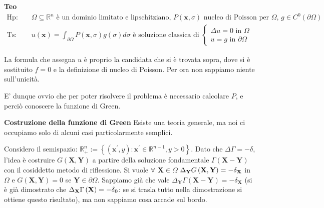 \documentclass{article}
\begin{document}
\textbf{Teo}%
\begin{eqnarray*}
\text{Hp}\text{: } &&\Omega \subseteq 
\mathbb{R}
^{n}\text{ \`{e} un dominio limitato e lipschitziano, }P\left( \mathbf{x}%
,\sigma \right) \text{ nucleo di Poisson per }\Omega \text{, }g\in
C^{0}\left( \partial \Omega \right) \\
\text{Ts}\text{: } &&u\left( \mathbf{x}\right) =\int_{\partial \Omega
}P\left( \mathbf{x},\sigma \right) g\left( \sigma \right) d\sigma \text{ 
\`{e} soluzione classica di }\left\{ 
\begin{array}{c}
\Delta u=0\text{ in }\Omega \\ 
u=g\text{ in }\partial \Omega%
\end{array}%
\right.
\end{eqnarray*}

La formula che assegna $u$ \`{e} proprio la candidata che si \`{e} trovata
sopra, dove si \`{e} sostituito $f=0$ e la definizione di nucleo di Poisson.
Per ora non sappiamo niente sull'unicit\`{a}.

E' dunque ovvio che per poter risolvere il problema \`{e} necessario
calcolare $P$, e perci\`{o} conoscere la funzione di Green.

\textbf{Costruzione della funzione di Green} Esiste una teoria generale, ma
noi ci occupiamo solo di alcuni casi particolarmente semplici.

Considero il semispazio: $%
\mathbb{R}
_{+}^{n}:=\left\{ \left( \mathbf{x}^{\prime },y\right) :\mathbf{x}^{\prime
}\in 
\mathbb{R}
^{n-1},y>0\right\} $. Dato che $\Delta \Gamma =-\delta $, l'idea \`{e}
costruire $G\left( \mathbf{X,Y}\right) $ a partire della soluzione
fondamentale $\Gamma \left( \mathbf{X-Y}\right) $ con il cosiddetto metodo
di riflessione. Si vuole $\forall $ $\mathbf{X}\in \Omega $ $\Delta _{%
\mathbf{Y}}G\left( \mathbf{X,Y}\right) =-\delta _{\mathbf{X}}$ in $\Omega $
e $G\left( \mathbf{X,Y}\right) =0$ se $\mathbf{Y}\in \partial \Omega $.
Sappiamo gi\`{a} che vale $\Delta _{\mathbf{Y}}\Gamma \left( \mathbf{X-Y}%
\right) =-\delta _{\mathbf{X}}$ (si \`{e} gi\`{a} dimostrato che $\Delta _{%
\mathbf{X}}\Gamma \left( \mathbf{X}\right) =-\delta _{\mathbf{0}}$: se si
trasla tutto nella dimostrazione si ottiene questo risultato), ma non
sappiamo cosa accade sul bordo.
\end{document}
